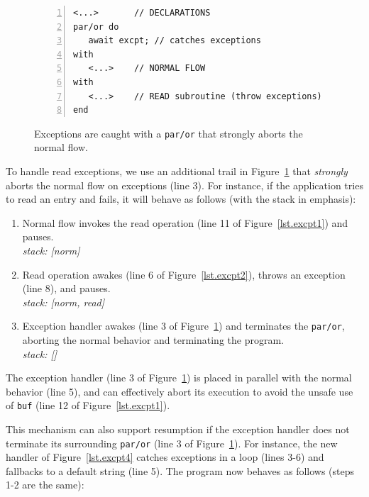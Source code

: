 \documentclass{acm_proc_article-sp}
\newcommand{\code}[1] {{\small{\texttt{#1}}}}
\newcommand{\1}{\;}
\newcommand{\2}{\;\;}
\newcommand{\3}{\;\;\;}
\newcommand{\5}{\;\;\;\;\;}
\begin{document}
\begin{figure}[t]
\begin{lstlisting}[numbers=left,xleftmargin=2em]
<...>       // DECLARATIONS
par/or do
   await excpt; // catches exceptions
with
   <...>    // NORMAL FLOW
with
   <...>    // READ subroutine (throw exceptions)
end
\end{lstlisting}
\caption{ Exceptions are caught with a \code{par/or} that strongly aborts the 
normal flow.
\label{lst.excpt3}
}
\end{figure}

To handle read exceptions, we use an additional trail in 
Figure~\ref{lst.excpt3} that \emph{strongly} aborts the normal flow on 
exceptions (line 3).
For instance, if the application tries to read an entry and fails, it will 
behave as follows (with the stack in emphasis):

{\small
\begin{enumerate}
\setlength{\itemsep}{0pt}
\item Normal flow invokes the read operation (line 11 of 
    Figure~\ref{lst.excpt1}) and pauses.\\
    \emph{stack: [norm]}
\item Read operation awakes (line 6 of Figure~\ref{lst.excpt2}), throws an 
    exception (line 8), and pauses.\\
    \emph{stack: [norm, read]}
\item Exception handler awakes (line 3 of Figure~\ref{lst.excpt3}) and 
terminates the \code{par/or}, aborting the normal behavior and terminating the 
program. \\
    \emph{stack: []}
\end{enumerate}
}

The exception handler (line 3 of Figure~\ref{lst.excpt3}) is placed in parallel 
with the normal behavior (line 5), and can effectively abort its execution to 
avoid the unsafe use of \code{buf} (line 12 of Figure~\ref{lst.excpt1}).
%

This mechanism can also support resumption if the exception handler does not 
terminate its surrounding \code{par/or} (line 3 of Figure~\ref{lst.excpt3}).
For instance, the new handler of Figure~\ref{lst.excpt4} catches exceptions in 
a loop (lines 3-6) and fallbacks to a default string (line 5).
The program now behaves as follows (steps 1-2 are the same):
\end{document}

